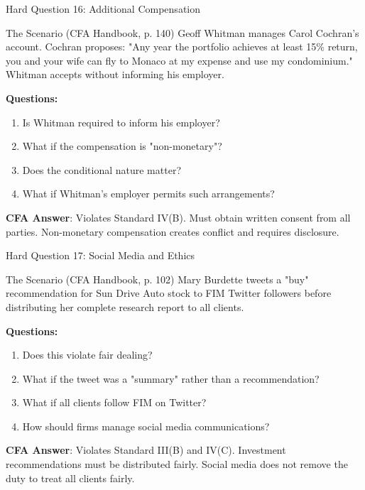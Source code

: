 \documentclass{beamer}
\begin{document}
	\begin{frame}{Hard Question 16: Additional Compensation}
		\begin{block}{The Scenario (CFA Handbook, p. 140)}
			Geoff Whitman manages Carol Cochran's account. Cochran proposes: "Any year the portfolio achieves at least 15\% return, you and your wife can fly to Monaco at my expense and use my condominium." Whitman accepts without informing his employer.
		\end{block}
		
		\vspace{0.2cm}
		\textbf{Questions:}
		\begin{enumerate}
			\item Is Whitman required to inform his employer?
			\item What if the compensation is "non-monetary"?
			\item Does the conditional nature matter?
			\item What if Whitman's employer permits such arrangements?
		\end{enumerate}
		
		\vspace{0.2cm}
		\textcolor{cfablue}{\textbf{CFA Answer}}: Violates Standard IV(B). Must obtain written consent from all parties. Non-monetary compensation creates conflict and requires disclosure.
	\end{frame}
	
	\begin{frame}{Hard Question 17: Social Media and Ethics}
		\begin{block}{The Scenario (CFA Handbook, p. 102)}
			Mary Burdette tweets a "buy" recommendation for Sun Drive Auto stock to FIM Twitter followers before distributing her complete research report to all clients.
		\end{block}
		
		\vspace{0.2cm}
		\textbf{Questions:}
		\begin{enumerate}
			\item Does this violate fair dealing?
			\item What if the tweet was a "summary" rather than a recommendation?
			\item What if all clients follow FIM on Twitter?
			\item How should firms manage social media communications?
		\end{enumerate}
		
		\vspace{0.2cm}
		\textcolor{cfablue}{\textbf{CFA Answer}}: Violates Standard III(B) and IV(C). Investment recommendations must be distributed fairly. Social media does not remove the duty to treat all clients fairly.
	\end{frame}
	
\end{document}
